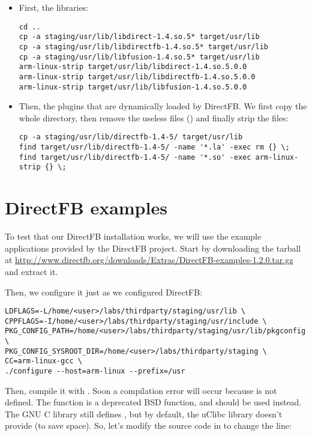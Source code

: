 \begin{itemize}

\item First, the libraries:
\small
\begin{verbatim}
cd ..
cp -a staging/usr/lib/libdirect-1.4.so.5* target/usr/lib
cp -a staging/usr/lib/libdirectfb-1.4.so.5* target/usr/lib
cp -a staging/usr/lib/libfusion-1.4.so.5* target/usr/lib
arm-linux-strip target/usr/lib/libdirect-1.4.so.5.0.0
arm-linux-strip target/usr/lib/libdirectfb-1.4.so.5.0.0
arm-linux-strip target/usr/lib/libfusion-1.4.so.5.0.0
\end{verbatim}
\normalsize

\item Then, the plugins that are dynamically loaded by DirectFB. We
  first copy the whole  directory, then
  remove the useless files () and finally strip the
   files:

\small
\begin{verbatim}
cp -a staging/usr/lib/directfb-1.4-5/ target/usr/lib
find target/usr/lib/directfb-1.4-5/ -name '*.la' -exec rm {} \;
find target/usr/lib/directfb-1.4-5/ -name '*.so' -exec arm-linux-strip {} \;
\end{verbatim}
\normalsize

\end{itemize}

\section{DirectFB examples}

To test that our DirectFB installation works, we will use the example
applications provided by the DirectFB project. Start by downloading
the tarball at
\url{http://www.directfb.org/downloads/Extras/DirectFB-examples-1.2.0.tar.gz}
and extract it.

Then, we configure it just as we configured DirectFB:

\small
\begin{verbatim}
LDFLAGS=-L/home/<user>/labs/thirdparty/staging/usr/lib \
CPPFLAGS=-I/home/<user>/labs/thirdparty/staging/usr/include \
PKG_CONFIG_PATH=/home/<user>/labs/thirdparty/staging/usr/lib/pkgconfig \
PKG_CONFIG_SYSROOT_DIR=/home/<user>/labs/thirdparty/staging \
CC=arm-linux-gcc \
./configure --host=arm-linux --prefix=/usr
\end{verbatim}
\normalsize

Then, compile it with . Soon a compilation error will occur
because  is not defined. The \code{bzero} function is a deprecated
BSD function, and  should be used instead. The GNU C library
still defines , but by default, the uClibc library doesn't
provide  (to save space). So, let's modify the source code in
\code{src/df_knuckles/matrix.c} to change the line:

